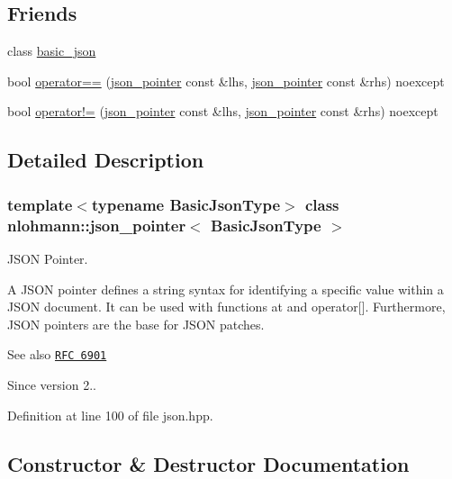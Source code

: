 \subsection*{Friends}
\begin{DoxyCompactItemize}
\item 
class \hyperlink{classnlohmann_1_1json__pointer_ada3100cdb8700566051828f1355fa745}{basic\+\_\+json}
\item 
bool \hyperlink{classnlohmann_1_1json__pointer_a4667ef558c8c3f8a646bfda0c6654653}{operator==} (\hyperlink{classnlohmann_1_1json__pointer}{json\+\_\+pointer} const \&lhs, \hyperlink{classnlohmann_1_1json__pointer}{json\+\_\+pointer} const \&rhs) noexcept
\item 
bool \hyperlink{classnlohmann_1_1json__pointer_a6779edcf28e6f018a3bbb29c0b4b5e1e}{operator!=} (\hyperlink{classnlohmann_1_1json__pointer}{json\+\_\+pointer} const \&lhs, \hyperlink{classnlohmann_1_1json__pointer}{json\+\_\+pointer} const \&rhs) noexcept
\end{DoxyCompactItemize}


\subsection{Detailed Description}
\subsubsection*{template$<$typename Basic\+Json\+Type$>$\newline
class nlohmann\+::json\+\_\+pointer$<$ Basic\+Json\+Type $>$}

J\+S\+ON Pointer. 

A J\+S\+ON pointer defines a string syntax for identifying a specific value within a J\+S\+ON document. It can be used with functions {\ttfamily at} and {\ttfamily operator\mbox{[}\mbox{]}}. Furthermore, J\+S\+ON pointers are the base for J\+S\+ON patches.

\begin{DoxySeeAlso}{See also}
\href{https://tools.ietf.org/html/rfc6901}{\tt R\+FC 6901}
\end{DoxySeeAlso}
\begin{DoxySince}{Since}
version 2.. 
\end{DoxySince}


Definition at line 100 of file json.\+hpp.



\subsection{Constructor \& Destructor Documentation}
\mbox{\label{classnlohmann_1_1json__pointer_a7f32d7c62841f0c4a6784cf741a6e4f8}} 
